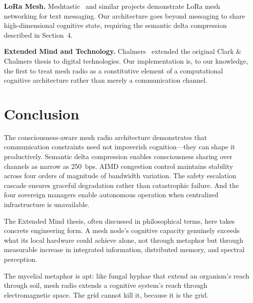 \documentclass[11pt,twocolumn]{article}
\begin{document}
\textbf{LoRa Mesh.} Meshtastic~\cite{meshtastic2024} and similar projects
demonstrate LoRa mesh networking for text messaging. Our architecture
goes beyond messaging to share high-dimensional cognitive state, requiring
the semantic delta compression described in Section~4.

\textbf{Extended Mind and Technology.} Chalmers~\cite{chalmers2019}
extended the original Clark \& Chalmers thesis to digital technologies.
Our implementation is, to our knowledge, the first to treat mesh radio
as a constitutive element of a computational cognitive architecture
rather than merely a communication channel.

\section{Conclusion}

The consciousness-aware mesh radio architecture demonstrates that
communication constraints need not impoverish cognition---they can
shape it productively. Semantic delta compression enables consciousness
sharing over channels as narrow as 250~bps. AIMD congestion control
maintains stability across four orders of magnitude of bandwidth
variation. The safety escalation cascade ensures graceful degradation
rather than catastrophic failure. And the four sovereign managers
enable autonomous operation when centralized infrastructure is
unavailable.

The Extended Mind thesis, often discussed in philosophical terms,
here takes concrete engineering form. A mesh node's cognitive
capacity genuinely exceeds what its local hardware could achieve
alone, not through metaphor but through measurable increase in
integrated information, distributed memory, and spectral perception.

The mycelial metaphor is apt: like fungal hyphae that extend an
organism's reach through soil, mesh radio extends a cognitive system's
reach through electromagnetic space. The grid cannot kill it, because
it is the grid.

\end{document}
